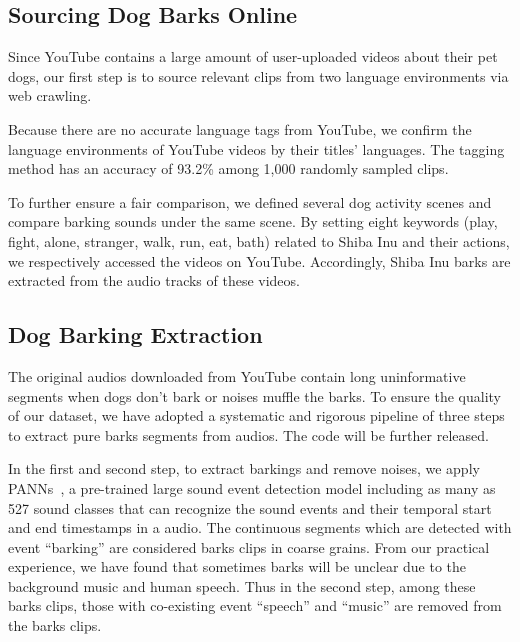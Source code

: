 \subsection{Sourcing Dog Barks Online}

Since YouTube contains a large amount of user-uploaded videos about their pet dogs, our first step is to source relevant clips from two language environments via web crawling.


Because there are no accurate language tags from YouTube, we confirm the language environments of YouTube videos by their titles' languages. The tagging method has an accuracy of 93.2\% among 1,000 randomly sampled clips.%

To further ensure a fair comparison, we defined several dog activity scenes and compare barking sounds under the same scene. 
By setting eight keywords (play, fight, alone, stranger, walk, run, eat, bath) related to Shiba Inu and their actions, we respectively accessed the videos on YouTube. Accordingly, Shiba Inu barks are extracted from the audio tracks of these videos.

\subsection{Dog Barking Extraction}

The original audios downloaded from YouTube contain long uninformative segments when dogs don't bark or noises muffle the barks. To ensure the quality of our dataset, we have adopted a systematic and rigorous pipeline of three steps to extract pure barks segments from audios. The code will be further released.

In the first and second step, to extract barkings and remove noises, we apply PANNs~\cite{kong2020panns}, a pre-trained large sound event detection model including as many as 527 sound classes that can recognize the sound events and their temporal start and end timestamps in a audio. The continuous segments which are detected with event ``barking'' are considered barks clips in coarse grains. From our practical experience, we have found that sometimes barks will be unclear due to the background music and human speech. Thus in the second step, among these barks clips, those with co-existing event ``speech'' and ``music'' are removed from the barks clips.

